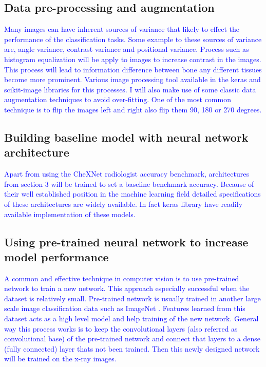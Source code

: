\documentclass[12pt, twoside, a4paper]{article}
\begin{document}
\subsection{Data pre-processing and augmentation}
\textcolor{blue}{Many images can have inherent sources of variance that likely to effect the performance of the classification tasks. Some example to these sources of variance are, angle variance, contrast variance and positional variance. Process such as histogram equalization will be apply to images to increase contrast in the images. This process will lead to information difference between bone any different tissues become more prominent. Various image processing tool available in the keras \cite{keras} and scikit-image \cite{skimage} libraries for this processes. 
I will also make use of some classic data augmentation techniques to avoid over-fitting. One of the most common technique is to flip the images left and right also flip them 90, 180 or 270 degrees.}

\subsection{Building baseline model with neural network architecture}
\textcolor{blue}{Apart from using the CheXNet \cite{CheXNetRP} radiologist accuracy benchmark, architectures from section 3 will be trained to set a baseline benchmark accuracy. Because of their well established position in the machine learning field detailed specifications of these architectures are widely available. In fact keras library \cite{keras} have readily available implementation of these models.}


\subsection{Using pre-trained neural network to increase model performance}
\textcolor{blue}{A common and effective technique in computer vision is to use pre-trained network to train a new network. This approach especially successful when the dataset is relatively small. Pre-trained network is usually trained in another large scale image classification data such as ImageNet \cite{imagenet}. Features learned from this dataset acts as a high level model and help training of the new network. General way this process works is to keep the convolutional layers (also referred as convolutional base) of the pre-trained network and connect that layers to a dense (fully connected) layer thats not been trained. Then this newly designed network will be trained on the x-ray images.}
\end{document}
